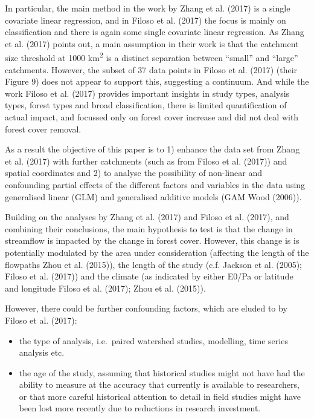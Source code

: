 \documentclass[]{elsarticle} %
\begin{document}
In particular, the main method in the work by Zhang et al. (2017) is a single covariate linear regression, and in Filoso et al. (2017) the focus is mainly on classification and there is again some single covariate linear regression. As Zhang et al. (2017) points out, a main assumption in their work is that the catchment size threshold at 1000 km\textsuperscript{2} is a distinct separation between ``small'' and ``large'' catchments. However, the subset of 37 data points in Filoso et al. (2017) (their Figure 9) does not appear to support this, suggesting a continuum. And while the work Filoso et al. (2017) provides important insights in study types, analysis types, forest types and broad classification, there is limited quantification of actual impact, and focussed only on forest cover increase and did not deal with forest cover removal.

As a result the objective of this paper is to 1) enhance the data set from Zhang et al. (2017) with further catchments (such as from Filoso et al. (2017)) and spatial coordinates and 2) to analyse the possibility of non-linear and confounding partial effects of the different factors and variables in the data using generalised linear (GLM) and generalised additive models (GAM Wood (2006)).

Building on the analyses by Zhang et al. (2017) and Filoso et al. (2017), and combining their conclusions, the main hypothesis to test is that the change in streamflow is impacted by the change in forest cover. However, this change is is potentially modulated by the area under consideration (affecting the length of the flowpaths Zhou et al. (2015)), the length of the study (c.f. Jackson et al. (2005); Filoso et al. (2017)) and the climate (as indicated by either E0/Pa or latitude and longitude Filoso et al. (2017); Zhou et al. (2015)).

However, there could be further confounding factors, which are eluded to by Filoso et al. (2017):

\begin{itemize}
\item
  the type of analysis, i.e.~paired watershed studies, modelling, time series analysis etc.
\item
  the age of the study, assuming that historical studies might not have had the ability to measure at the accuracy that currently is available to researchers, or that more careful historical attention to detail in field studies might have been lost more recently due to reductions in research investment.
\end{itemize}
\end{document}
